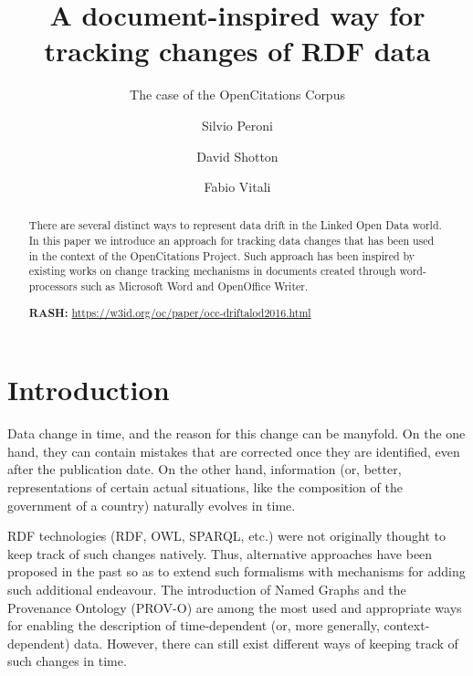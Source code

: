 \documentclass[runningheads,a4paper]{llncs}
\begin{document}
\mainmatter

\title{A document-inspired way for \\tracking changes of RDF data}
\subtitle{The case of the OpenCitations Corpus}
\author{Silvio Peroni \and
David Shotton \and
Fabio Vitali}
\maketitle

\begin{abstract}
There are several distinct ways to represent data drift in the Linked Open Data world. In this paper we introduce an approach for tracking data changes that has been used in the context of the OpenCitations Project. Such approach has been inspired by existing works on change tracking mechanisms in documents created through word-processors such as Microsoft Word and OpenOffice Writer.

{\bf RASH:} \url{https://w3id.org/oc/paper/occ-driftalod2016.html}

\end{abstract}


\section{Introduction}

Data change in time, and the reason for this change can be manyfold. On the one hand, they can contain mistakes that are corrected once they are identified, even after the publication date. On the other hand, information (or, better, representations of certain actual situations, like the composition of the government of a country) naturally evolves in time.

RDF technologies (RDF, OWL, SPARQL, etc.) were not originally thought to keep track of such changes natively. Thus, alternative approaches have been proposed in the past so as to extend such formalisms with mechanisms for adding such additional endeavour. The introduction of Named Graphs  \cite{__RefNumPara__17367_1591320820} and the Provenance Ontology (PROV-O)  \cite{__RefNumPara__17349_1591320820} are among the most used and appropriate ways for enabling the description of time-dependent (or, more generally, context-dependent) data. However, there can still exist different ways of keeping track of such changes in time.
\end{document}
